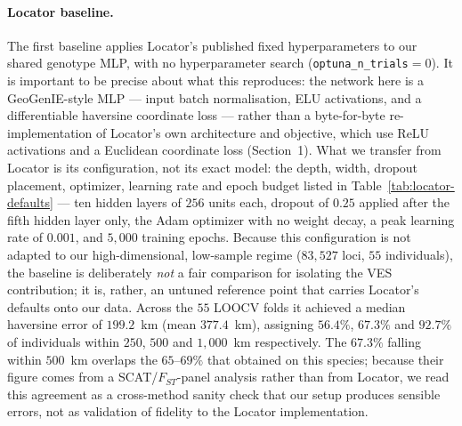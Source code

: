 \documentclass[twocolumn,10pt]{article}
\begin{document}
\paragraph{Locator baseline.} The first baseline applies Locator's published fixed hyperparameters
\citep{battey2020predicting} to our shared genotype MLP, with no hyperparameter search
(\texttt{optuna\_n\_trials}${}=0$). It is important to be precise about what this reproduces: the
network here is a GeoGenIE-style MLP --- input batch normalisation, ELU activations, and a
differentiable haversine coordinate loss --- rather than a byte-for-byte re-implementation of
Locator's own architecture and objective, which use ReLU activations and a Euclidean coordinate loss
(Section~1). What we transfer from Locator is its configuration, not its exact model: the depth,
width, dropout placement, optimizer, learning rate and epoch budget listed in
Table~\ref{tab:locator-defaults} --- ten hidden layers of $256$ units each, dropout of $0.25$
applied after the fifth hidden layer only, the Adam optimizer \citep{kingma2014adam} with no weight
decay, a peak learning rate of $0.001$, and $5{,}000$ training epochs. Because this configuration is
not adapted to our high-dimensional, low-sample regime ($83{,}527$ loci, $55$ individuals), the
baseline is deliberately \emph{not} a fair comparison for isolating the VES contribution; it is,
rather, an untuned reference point that carries Locator's defaults onto our data. Across the $55$
LOOCV folds it achieved a median haversine error of $199.2$~km (mean $377.4$~km), assigning
$56.4\%$, $67.3\%$ and $92.7\%$ of individuals within $250$, $500$ and $1{,}000$~km respectively.
The $67.3\%$ falling within $500$~km overlaps the $65$--$69\%$ that \citet{lazzari2025development}
obtained on this species; because their figure comes from a SCAT/$F_{ST}$-panel analysis rather than
from Locator, we read this agreement as a cross-method sanity check that our setup produces sensible
errors, not as validation of fidelity to the Locator implementation.
\end{document}
